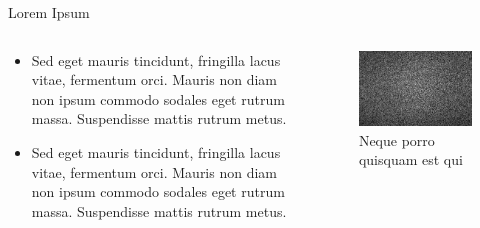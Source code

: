 \documentclass[UKenglish, aspectratio = 169]{beamer}
\begin{document}
\begin{frame}{Lorem Ipsum}
	\begin{columns}
		\begin{column}[T]{0.5\textwidth}
			\vspace*{4ex}
			\begin{itemize}
				\item Sed eget mauris tincidunt, fringilla lacus vitae, fermentum orci. Mauris non diam non ipsum commodo sodales eget rutrum massa. Suspendisse mattis rutrum metus.
				\item Sed eget mauris tincidunt, fringilla lacus vitae, fermentum orci. Mauris non diam non ipsum commodo sodales eget rutrum massa. Suspendisse mattis rutrum metus.
			\end{itemize}
		\end{column}
		\begin{column}{0.5\textwidth}
			\begin{figure}
				\centering
				\includegraphics{figs/stock photo.jpg}
				\caption{\tiny{Neque porro quisquam est qui }}
			\end{figure}
		\end{column}
	\end{columns}
\end{frame}
\end{document}

